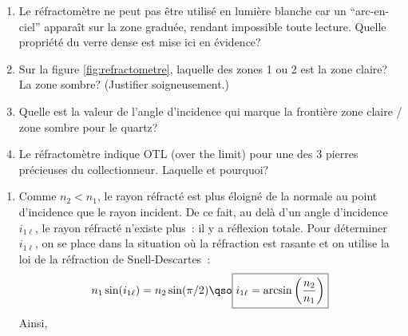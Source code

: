 \documentclass[a4paper, 11pt, garamond, oneside]{book}
\begin{document}
{	\begin{enumerate}
		\item Le réfractomètre ne peut pas être utilisé en lumière blanche car un
		      “arc-en-ciel” apparaît sur la zone graduée, rendant impossible toute
		      lecture. Quelle propriété du verre dense est mise ici en évidence?
		\item Sur la figure \ref{fig:refractometre}, laquelle des zones 1 ou  2 est
		      la zone claire? La zone sombre? (Justifier soigneusement.)
		\item Quelle est la valeur de l'angle d'incidence qui marque la frontière
		      zone claire / zone sombre pour le quartz?
		\item Le réfractomètre indique OTL (over the limit) pour une des 3 pierres
		      précieuses du collectionneur. Laquelle et pourquoi?
	\end{enumerate}
}{
	\begin{enumerate}
		\item Comme $n_2<n_1$, le rayon réfracté est plus éloigné de la normale au
		      point d'incidence que le rayon incident. De ce fait, au delà d'un
		      angle d'incidence $i_{1\ell}$, le rayon réfracté n'existe plus~: il y
		      a réflexion totale. Pour déterminer $i_{1\ell}$, on se place dans la
		      situation où la réfraction est rasante et on utilise la loi de la
		      réfraction de Snell-Descartes~:
		      \[
			      n_1\sin(i_{1\ell})=n_2\sin(\pi/2)
			      \qso
			      \boxed{i_{1\ell}=\arcsin\left(\frac{n_2}{n_1}\right)}
		      \]
		      Ainsi, %


\end{enumerate}}
\end{document}
